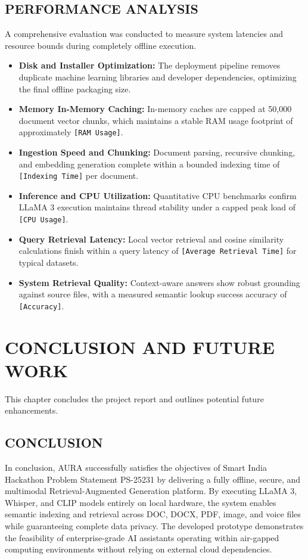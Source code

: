 \documentclass[12pt,a4paper]{report}
\begin{document}
\section{PERFORMANCE ANALYSIS}
A comprehensive evaluation was conducted to measure system latencies and resource bounds during completely offline execution.
\begin{itemize}
    \item \textbf{Disk and Installer Optimization:} The deployment pipeline removes duplicate machine learning libraries and developer dependencies, optimizing the final offline packaging size.
    \item \textbf{Memory In-Memory Caching:} In-memory caches are capped at 50,000 document vector chunks, which maintains a stable RAM usage footprint of approximately \texttt{[RAM Usage]}.
    \item \textbf{Ingestion Speed and Chunking:} Document parsing, recursive chunking, and embedding generation complete within a bounded indexing time of \texttt{[Indexing Time]} per document.
    \item \textbf{Inference and CPU Utilization:} Quantitative CPU benchmarks confirm LLaMA 3 execution maintains thread stability under a capped peak load of \texttt{[CPU Usage]}.
    \item \textbf{Query Retrieval Latency:} Local vector retrieval and cosine similarity calculations finish within a query latency of \texttt{[Average Retrieval Time]} for typical datasets.
    \item \textbf{System Retrieval Quality:} Context-aware answers show robust grounding against source files, with a measured semantic lookup success accuracy of \texttt{[Accuracy]}.
\end{itemize}

\chapter{CONCLUSION AND FUTURE WORK}
\label{ch:conclusion_and_future}

This chapter concludes the project report and outlines potential future enhancements.

\section{CONCLUSION}
In conclusion, AURA successfully satisfies the objectives of Smart India Hackathon Problem Statement PS-25231 by delivering a fully offline, secure, and multimodal Retrieval-Augmented Generation platform. By executing LLaMA 3, Whisper, and CLIP models entirely on local hardware, the system enables semantic indexing and retrieval across DOC, DOCX, PDF, image, and voice files while guaranteeing complete data privacy. The developed prototype demonstrates the feasibility of enterprise-grade AI assistants operating within air-gapped computing environments without relying on external cloud dependencies.
\end{document}
